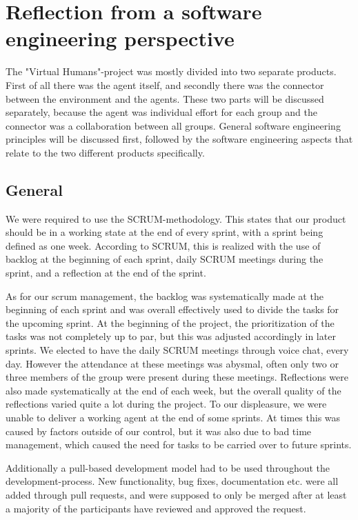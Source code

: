 \chapter[Reflection from a software engineering perspective]{Reflection from a software \\ engineering perspective}
\label{chap:Reflection from a software engineering perspective}

The "Virtual Humans"-project was mostly divided into two separate products.
First of all there was the agent itself, and secondly there was the connector between the environment and the agents.
These two parts will be discussed separately, because the agent was individual effort for each group and the connector was a collaboration between all groups. General software engineering principles will be discussed first,
followed by the software engineering aspects that relate to the two different products specifically.

\section{General}
\label{sec:General}

We were required to use the SCRUM-methodology. This states that our product should be in a working state at the end of every sprint, with a sprint being defined as one week.
According to SCRUM, this is realized with the use of backlog at the beginning of each sprint, daily SCRUM meetings during the sprint, and a reflection at the end of the sprint.

As for our scrum management, the backlog was systematically made at the beginning of each sprint and was overall effectively used to divide the tasks for the upcoming sprint. At the beginning of the project, the prioritization of the tasks was not completely up to par, but this was adjusted accordingly in later sprints.
We elected to have the daily SCRUM meetings through voice chat, every day. However the attendance at these meetings was abysmal, often only two or three members of the group were present during these meetings.
Reflections were also made systematically at the end of each week, but the overall quality of the reflections varied quite a lot during the project.
To our displeasure, we were unable to deliver a working agent at the end of some sprints. At times this was caused by factors outside of our control, but it was also due to bad time management,
which caused the need for tasks to be carried over to future sprints.

Additionally a pull-based development model had to be used throughout the development-process. New functionality, bug fixes, documentation etc. were all added through pull requests, and were supposed to only be merged after at least a majority of the participants have reviewed and approved the request. 

